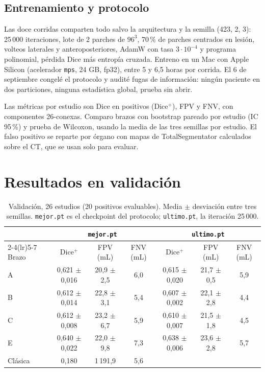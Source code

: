 \documentclass[11pt,a4paper]{article}
\begin{document}
\subsection{Entrenamiento y protocolo}

Las doce corridas comparten todo salvo la arquitectura y la semilla (423, 2, 3): 25\,000 iteraciones, lote de 2 parches de $96^3$, 70\,\% de parches centrados en lesión, volteos laterales y anteroposteriores, AdamW con tasa $3\cdot10^{-4}$ y programa polinomial, pérdida Dice más entropía cruzada. Entreno en un Mac con Apple Silicon (acelerador \texttt{mps}, 24 GB, fp32), entre 5 y 6,5 horas por corrida. El 6 de septiembre congelé el protocolo y audité fugas de información: ningún paciente en dos particiones, ninguna estadística global, prueba sin abrir.

Las métricas por estudio son Dice en positivos (Dice$^+$), FPV y FNV, con componentes 26-conexas. Comparo brazos con bootstrap pareado por estudio (IC 95\,\%) y prueba de Wilcoxon, usando la media de las tres semillas por estudio. El falso positivo se reparte por órgano con mapas de TotalSegmentator calculados sobre el CT, que se usan solo para evaluar.

\section{Resultados en validación}

\begin{table}[h]
\centering\small
\caption{Validación, 26 estudios (20 positivos evaluables). Media $\pm$ desviación entre tres semillas. \texttt{mejor.pt} es el checkpoint del protocolo; \texttt{ultimo.pt}, la iteración 25\,000.}
\begin{tabular}{lcccccc}
\toprule
 & \multicolumn{3}{c}{\texttt{mejor.pt}} & \multicolumn{3}{c}{\texttt{ultimo.pt}} \\
\cmidrule(lr){2-4}\cmidrule(lr){5-7}
Brazo & Dice$^+$ & FPV (mL) & FNV (mL) & Dice$^+$ & FPV (mL) & FNV (mL) \\
\midrule
A & 0,621 $\pm$ 0,016 & 20,9 $\pm$ 2,5 & 6,0 & 0,615 $\pm$ 0,020 & 21,7 $\pm$ 0,5 & 5,9 \\
B & 0,612 $\pm$ 0,014 & 22,8 $\pm$ 3,1 & 5,4 & 0,607 $\pm$ 0,002 & 22,1 $\pm$ 2,8 & 4,4 \\
C & 0,612 $\pm$ 0,008 & 23,2 $\pm$ 6,7 & 5,9 & 0,610 $\pm$ 0,007 & 21,5 $\pm$ 1,8 & 4,5 \\
E & 0,640 $\pm$ 0,022 & 22,0 $\pm$ 9,8 & 7,3 & 0,638 $\pm$ 0,006 & 23,6 $\pm$ 2,8 & 5,7 \\
Clásica & 0,180 & 1\,191,9 & 5,6 & & & \\
\bottomrule
\end{tabular}
\end{table}
\end{document}
